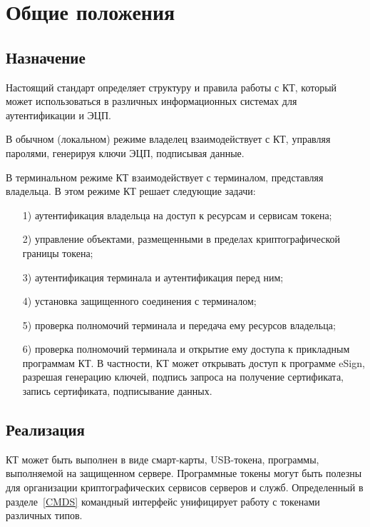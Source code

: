 \chapter{Общие положения}\label{COMMON}

\section{Назначение}

Настоящий стандарт определяет структуру и правила работы с КТ,
который может использоваться в различных информационных системах
для аутентификации и ЭЦП.

В обычном (локальном) режиме владелец взаимодействует с КТ, 
управляя паролями, генерируя ключи ЭЦП, подписывая данные.

В терминальном режиме КТ взаимодействует с терминалом, представляя владельца.
В этом режиме КТ решает следующие задачи: 
\begin{itemize}
\item[1)]
аутентификация владельца на доступ к ресурсам и сервисам токена; 
\item[2)]
управление объектами, размещенными в пределах криптографической границы токена;
\item[3)]
аутентификация терминала и аутентификация перед ним;
\item[4)]
установка защищенного соединения с терминалом;
\item[5)]
проверка полномочий терминала и передача ему ресурсов владельца;
\item[6)]
проверка полномочий терминала и открытие ему доступа к прикладным программам 
КТ. В частности, КТ может открывать доступ к программе eSign, разрешая
генерацию ключей, подпись запроса на получение сертификата, запись 
сертификата, подписывание данных.
\end{itemize}


\section{Реализация} 

КТ может быть выполнен в виде смарт-карты, USB-токена, программы, 
выполняемой на защищенном сервере. Программные токены могут быть полезны 
для организации криптографических сервисов серверов и служб. Определенный 
в разделе~\ref{CMDS} командный интерфейс унифицирует работу с токенами 
различных типов.  

